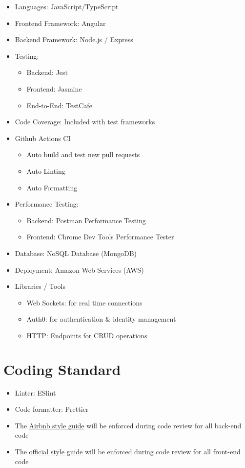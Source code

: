 \documentclass{article}
\begin{document}
\begin{itemize}
\item Languages: JavaScript/TypeScript
\item Frontend Framework: Angular
\item Backend Framework: Node.js / Express
\item Testing:
   \begin{itemize}
       \item Backend: Jest
       \item Frontend: Jasmine
       \item End-to-End: TestCafe
   \end{itemize}
\item Code Coverage: Included with test frameworks
\item Github Actions CI 
    \begin{itemize}
        \item Auto build and test new pull requests
        \item Auto Linting
        \item Auto Formatting
    \end{itemize}
\item Performance Testing: 
    \begin{itemize}
       \item Backend: Postman Performance Testing
       \item Frontend: Chrome Dev Tools Performance Tester
   \end{itemize}
\item Database: NoSQL Database (MongoDB)
\item Deployment: Amazon Web Services (AWS)
\item Libraries / Tools
\begin{itemize}
    \item Web Sockets: for real time connections
    \item Auth0: for authentication \& identity management
    \item HTTP: Endpoints for CRUD operations
\end{itemize}
\end{itemize}

\section{Coding Standard}

\begin{itemize}
    \item Linter: ESlint
    \item Code formatter: Prettier
    \item The \href{https://github.com/airbnb/javascript}{Airbnb style guide} will be enforced during code review for all back-end code
    \item The \href{https://angular.io/guide/styleguide}{official style guide} will be enforced during code review for all front-end code
\end{itemize}
\end{document}
